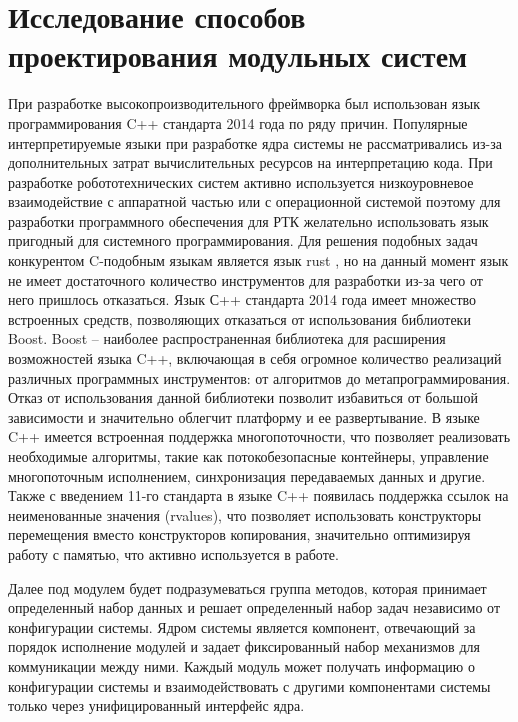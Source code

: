 \section{Исследование способов проектирования модульных систем}

При разработке высокопроизводительного фреймворка был 
использован язык программирования C++ стандарта 2014 года по 
ряду причин. Популярные интерпретируемые языки при разработке 
ядра системы не рассматривались из-за дополнительных затрат 
вычислительных ресурсов на интерпретацию кода. При разработке 
робототехнических систем активно используется низкоуровневое 
взаимодействие с аппаратной частью или с операционной системой 
поэтому для разработки программного обеспечения для РТК 
желательно использовать язык пригодный для системного 
программирования. Для решения подобных задач конкурентом 
C-подобным языкам является язык rust \cite{matsakis2014rust}, но 
на данный момент язык не имеет достаточного количество 
инструментов для разработки из-за чего от него пришлось 
отказаться. Язык С++ стандарта 2014 года имеет множество 
встроенных средств, позволяющих отказаться от использования 
библиотеки Boost. Boost – наиболее распространенная библиотека 
для расширения возможностей языка C++, включающая в себя 
огромное количество реализаций различных программных 
инструментов: от алгоритмов до метапрограммирования. 
Отказ от использования данной библиотеки позволит избавиться от 
большой зависимости и значительно облегчит платформу и ее 
развертывание. В языке C++ имеется встроенная поддержка 
многопоточности, что позволяет реализовать необходимые 
алгоритмы, такие как потокобезопасные контейнеры, управление 
многопоточным исполнением, синхронизация передаваемых данных и 
другие. Также с введением 11-го стандарта в языке C++ появилась 
поддержка ссылок на неименованные значения (rvalues), что 
позволяет использовать конструкторы перемещения вместо 
конструкторов копирования, значительно оптимизируя работу с 
памятью, что активно используется в работе.

Далее под модулем будет подразумеваться группа методов, которая 
принимает определенный набор данных и решает определенный набор 
задач независимо от конфигурации системы. Ядром системы является 
компонент, отвечающий за порядок исполнение модулей и задает 
фиксированный набор механизмов для коммуникации между ними. 
Каждый модуль может получать информацию о конфигурации системы и 
взаимодействовать с другими компонентами системы только через 
унифицированный интерфейс ядра.


